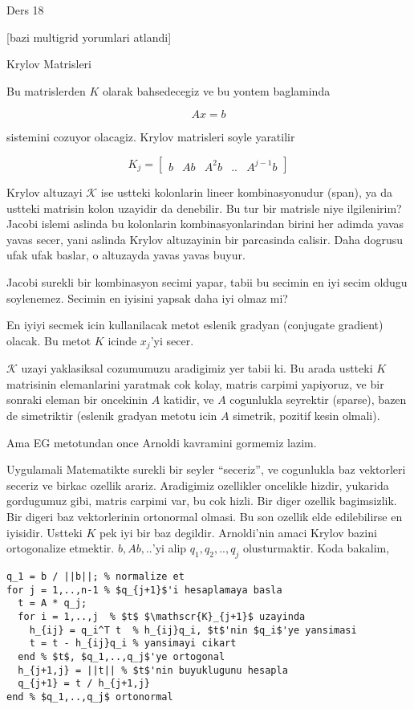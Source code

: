 \documentclass[12pt,fleqn]{article}\usepackage{../common}
\begin{document}
Ders 18

[bazi multigrid yorumlari atlandi]

Krylov Matrisleri 

Bu matrislerden $K$ olarak bahsedecegiz ve bu yontem baglaminda 

\[ Ax = b \]

sistemini cozuyor olacagiz. Krylov matrisleri soyle yaratilir

\[ K_j = \left[\begin{array}{rrrrr}
b & Ab & A^2b & .. & A^{j-1}b
\end{array}\right] \]

Krylov altuzayi $\mathscr{K}$ ise ustteki kolonlarin lineer kombinasyonudur
(span), ya da ustteki matrisin kolon uzayidir da denebilir. Bu tur bir
matrisle niye ilgilenirim? Jacobi islemi aslinda bu kolonlarin
kombinasyonlarindan birini her adimda yavas yavas secer, yani aslinda
Krylov altuzayinin bir parcasinda calisir. Daha dogrusu ufak ufak baslar, o
altuzayda yavas yavas buyur.

Jacobi surekli bir kombinasyon secimi yapar, tabii bu secimin en iyi secim
oldugu soylenemez. Secimin en iyisini yapsak daha iyi olmaz mi? 

En iyiyi secmek icin kullanilacak metot eslenik gradyan (conjugate
gradient) olacak. Bu metot $K$ icinde $x_j$'yi secer. 

$\mathscr{K}$ uzayi yaklasiksal cozumumuzu aradigimiz yer tabii ki. Bu arada ustteki
$K$ matrisinin elemanlarini yaratmak cok kolay, matris carpimi yapiyoruz, ve
bir sonraki eleman bir oncekinin $A$ katidir, ve $A$ cogunlukla seyrektir
(sparse), bazen de simetriktir (eslenik gradyan metotu icin $A$ simetrik,
pozitif kesin olmali).

Ama EG metotundan once Arnoldi kavramini gormemiz lazim. 

Uygulamali Matematikte surekli bir seyler ``seceriz'', ve cogunlukla baz
vektorleri seceriz ve birkac ozellik arariz. Aradigimiz ozellikler
oncelikle hizdir, yukarida gordugumuz gibi, matris carpimi var, bu cok
hizli. Bir diger ozellik bagimsizlik. Bir digeri baz vektorlerinin
ortonormal olmasi. Bu son ozellik elde edilebilirse en iyisidir. Ustteki
$K$ pek iyi bir baz degildir. Arnoldi'nin amaci Krylov bazini ortogonalize
etmektir. $b,Ab,..$'yi alip $q_1,q_2,..,q_j$ olusturmaktir. Koda bakalim, 

\begin{verbatim}
q_1 = b / ||b||; % normalize et
for j = 1,..,n-1 % $q_{j+1}$'i hesaplamaya basla
  t = A * q_j; 
  for i = 1,..,j  % $t$ $\mathscr{K}_{j+1}$ uzayinda
    h_{ij} = q_i^T t  % h_{ij}q_i, $t$'nin $q_i$'ye yansimasi
    t = t - h_{ij}q_i % yansimayi cikart
  end % $t$, $q_1,..,q_j$'ye ortogonal
  h_{j+1,j} = ||t|| % $t$'nin buyuklugunu hesapla
  q_{j+1} = t / h_{j+1,j}
end % $q_1,..,q_j$ ortonormal
\end{verbatim}
\end{document}
